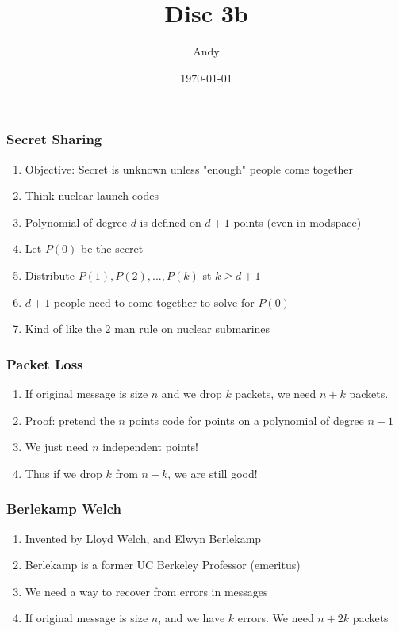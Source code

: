 \documentclass{beamer}
\title{Disc 3b}
\author{Andy}
\institute{UC Berkeley}
\date{\today}
\begin{document}
\begin{frame}
  \titlepage
\end{frame}

\begin{frame}
  \frametitle{Secret Sharing}

    \begin{enumerate}[<+->]
      \item Objective: Secret  is unknown unless "enough" people come together
      \item Think nuclear launch codes
      \item Polynomial of degree $d$ is defined on $d+1$ points (even in modspace)
      \item Let $P(0)$ be the secret
      \item Distribute $P(1), P(2), ..., P(k)$ st $k \geq d + 1$
      \item $d+1$ people need to come together to solve for $P(0)$
      \item Kind of like the 2 man rule on nuclear submarines
    \end{enumerate}

\end{frame}

\begin{frame}
  \frametitle{Packet Loss}

    \begin{enumerate}[<+->]
      \item If original message is size $n$ and we drop $k$ packets, we need $n + k$ packets.
      \item Proof: pretend the $n$ points code for points on a polynomial of degree $n-1$
      \item We just need $n$ independent points!
      \item Thus if we drop $k$ from $n + k$, we are still good!
    \end{enumerate}

\end{frame}

\begin{frame}
  \frametitle{Berlekamp Welch}

    \begin{enumerate}[<+->]
      \item Invented by Lloyd Welch, and Elwyn Berlekamp
      \item Berlekamp is a former UC Berkeley Professor (emeritus)
      \item We need a way to recover from errors in messages
      \item If original message is size $n$, and we have $k$ errors. We need $n + 2k$ packets
    \end{enumerate}

\end{frame}
\end{document}
